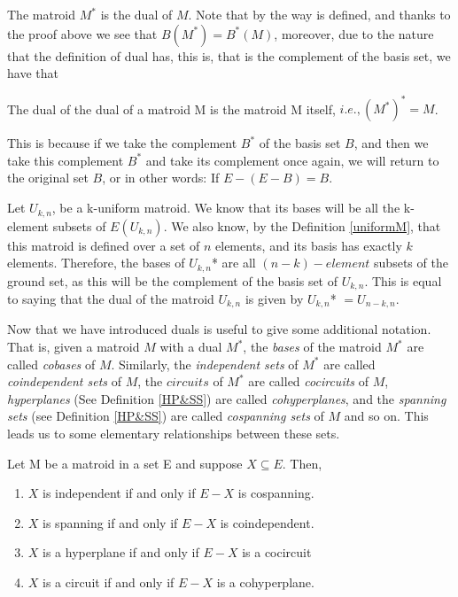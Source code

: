 The matroid $M^*$ is the dual of $M$. Note that by the way is defined, and thanks to the proof above we see that $B(M^*)=B^*(M)$, moreover, due to the nature that the definition of dual has, this is, that is the complement of the basis set, we have that
\begin{lemma}
    The dual of the dual of a matroid M is the matroid M itself, $i.e., (M^*)^* = M$.
\end{lemma}

This is because if we take the complement $B^*$ of the basis set $B$, and then we take this complement $B^*$ and take its complement once again, we will return to the original set $B$, or in other words: If $E-(E - B) = B$.

\begin{exmp}
    Let $U_{k,n}$, be a k-uniform matroid. We know that its bases will be all the k-element subsets of $E(U_{k,n})$. We also know, by the Definition \ref{uniformM}, that this matroid is defined over a set of $n$ elements, and its basis has exactly $k$ elements. Therefore, the bases of $U_{k,n}$* are all $(n-k)-element$ subsets of the ground set, as this will be the complement of the basis set of $U_{k,n}$. This is equal to saying that the dual of the matroid $U_{k,n}$ is given by $U_{k,n}$* $= U_{n-k,n}$.
\end{exmp}

Now that we have introduced duals is useful to give some additional notation. That is, given a matroid $M$ with a dual $M^*$, the \textit{bases} of the matroid $M^*$ are called \textit{cobases} of $M$. Similarly, the \textit{independent sets} of $M^*$ are called \textit{coindependent sets} of $M$, the $circuits$ of $M^*$ are called \textit{cocircuits} of $M$, \textit{hyperplanes} (See Definition \ref{HP&SS}) are called \textit{cohyperplanes}, and the \textit{spanning sets} (see Definition \ref{HP&SS}) are called \textit{cospanning sets} of $M$ and so on. This leads us to some elementary relationships between these sets. 

\begin{theorem}\label{propositionsofdualrelations}
    Let M be a matroid in a set E and suppose $X \subseteq E$. Then,
    \begin{enumerate}
        \item $X$ is independent if and only if $E-X$ is cospanning.

        \item $X$ is spanning if and only if $E-X$ is coindependent.

        \item $X$ is a hyperplane if and only if $E-X$ is a cocircuit

        \item $X$ is a circuit if and only if $E-X$ is a cohyperplane.
    \end{enumerate}
\end{theorem} 

